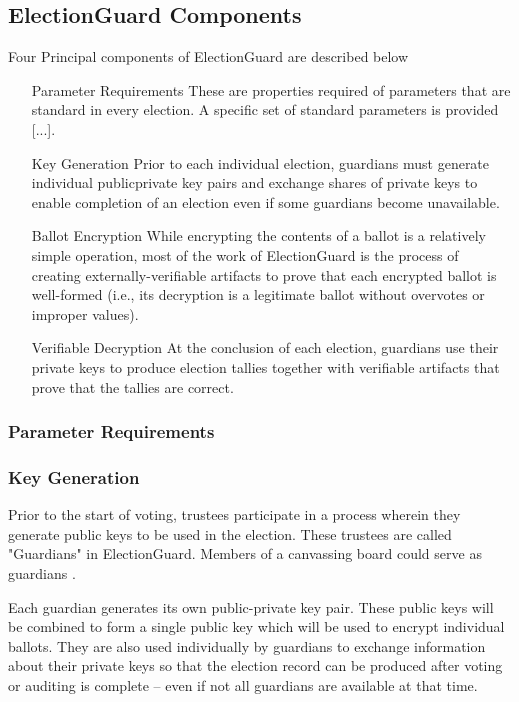 \subsection{ElectionGuard Components}
Four Principal components of ElectionGuard are described below \cite[3-4]{eg-spec}
\begin{itemize}
    \item[Parameter Requirements] These are properties required of parameters that are standard in every election. A
          specific set of standard parameters is provided [...].
    \item[Key Generation] Prior to each individual election, guardians must generate individual publicprivate key
          pairs and exchange shares of private keys to enable completion of an election even if some guardians become
          unavailable.
    \item[Ballot Encryption] While encrypting the contents of a ballot is a relatively simple operation, most of the
          work of ElectionGuard is the process of creating externally-verifiable artifacts to prove that each
          encrypted ballot is well-formed (i.e., its decryption is a legitimate ballot without overvotes or improper values).
    \item[Verifiable Decryption]
          At the conclusion of each election, guardians use their private keys to produce election tallies
          together with verifiable artifacts that prove that the tallies are correct.
\end{itemize}

\subsubsection{Parameter Requirements}

\subsubsection{Key Generation}
Prior to the start of voting, trustees participate in a process wherein they generate public keys to be used in the
election. These trustees are called "Guardians" in ElectionGuard. Members of a canvassing board could serve as
guardians \cite[2]{eg-spec}.

Each guardian generates its own public-private key pair. These public keys will be combined to form a single public
key which will be used to encrypt individual ballots. They are also used individually by guardians to exchange
information about their private keys so that the election record can be produced after voting or auditing is
complete – even if not all guardians are available at that time.


